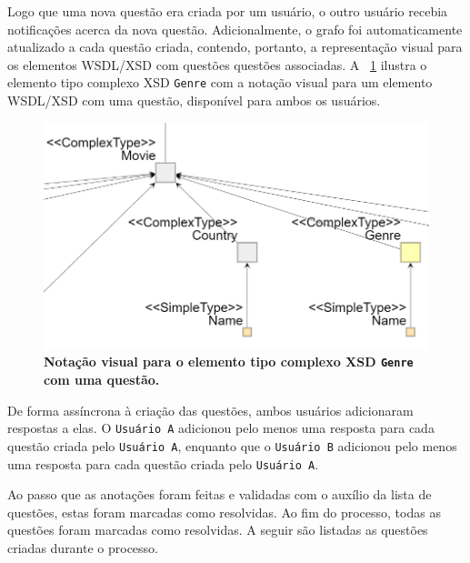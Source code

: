 Logo que uma nova questão era criada por um usuário, o outro usuário recebia notificações acerca da nova questão. Adicionalmente, o grafo foi automaticamente atualizado a cada questão criada, contendo, portanto, a representação visual para os elementos WSDL/XSD com questões questões associadas. A \figurename~\ref{fig:estudo-de-caso-grafo-wsdl-com-questao} ilustra o elemento tipo complexo XSD \texttt{Genre} com a notação visual para um elemento WSDL/XSD com uma questão, disponível para ambos os usuários. 

    \begin{figure}[h]
            \includegraphics[scale=1]{5-grasews-estudo-de-caso/imagens/estudo-de-caso-grafo-wsdl-com-questao.png}
        \centering
        \caption[Notação visual para o elemento tipo complexo XSD \texttt{Genre} com uma questão]{\textbf{Notação visual para o elemento tipo complexo XSD \texttt{Genre} com uma questão.}}
        \label{fig:estudo-de-caso-grafo-wsdl-com-questao}
    \end{figure}

De forma assíncrona à criação das questões, ambos usuários adicionaram respostas a elas. O \texttt{Usuário A} adicionou pelo menos uma resposta para cada questão criada pelo \texttt{Usuário A}, enquanto que o \texttt{Usuário B} adicionou pelo menos uma resposta para cada questão criada pelo \texttt{Usuário A}.

Ao passo que as anotações foram feitas e validadas com o auxílio da lista de questões, estas foram marcadas como resolvidas. Ao fim do processo, todas as questões foram marcadas como resolvidas. A seguir são listadas as questões criadas durante o processo.

